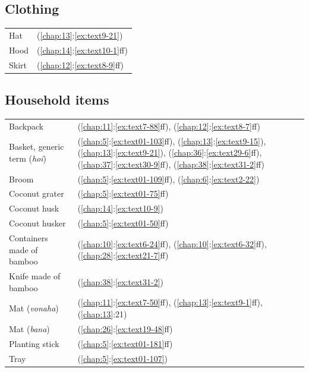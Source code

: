 \subsection{Clothing}

\begin{tabularx}{\textwidth}{p{5cm}X}
    Hat&(\ref{chap:13}:\ref{ex:text9-21})\\
    Hood&(\ref{chap:14}:\ref{ex:text10-1}ff)\\
    Skirt&(\ref{chap:12}:\ref{ex:text8-9}ff)\\
\end{tabularx}

\subsection{Household items}

\begin{tabularx}{\textwidth}{p{5cm}X}
    Backpack&(\ref{chap:11}:\ref{ex:text7-88}ff), (\ref{chap:12}:\ref{ex:text8-7}ff)\\
    Basket, generic term (\textit{hoi})&(\ref{chap:5}:\ref{ex:text01-103}ff), (\ref{chap:13}:\ref{ex:text9-15}), (\ref{chap:13}:\ref{ex:text9-21}), (\ref{chap:36}:\ref{ex:text29-6}ff), (\ref{chap:37}:\ref{ex:text30-9}ff), (\ref{chap:38}:\ref{ex:text31-2}ff)\\
    Broom&(\ref{chap:5}:\ref{ex:text01-109}ff), (\ref{chap:6}:\ref{ex:text2-22})\\
    Coconut grater&(\ref{chap:5}:\ref{ex:text01-75}ff)\\
    Coconut husk&(\ref{chap:14}:\ref{ex:text10-9})\\
    Coconut husker&(\ref{chap:5}:\ref{ex:text01-50}ff)\\
    Containers made of bamboo&(\ref{chap:10}:\ref{ex:text6-24}ff), (\ref{chap:10}:\ref{ex:text6-32}ff), (\ref{chap:28}:\ref{ex:text21-7}ff)\\
    Knife made of bamboo&(\ref{chap:38}:\ref{ex:text31-2})\\
    Mat (\textit{vonaha})&(\ref{chap:11}:\ref{ex:text7-50}ff), (\ref{chap:13}:\ref{ex:text9-1}ff), (\ref{chap:13}:21)\\
    Mat (\textit{bana})&(\ref{chap:26}:\ref{ex:text19-48}ff)\\
    Planting stick&(\ref{chap:5}:\ref{ex:text01-181}ff)\\
    Tray&(\ref{chap:5}:\ref{ex:text01-107})\\
\end{tabularx}

